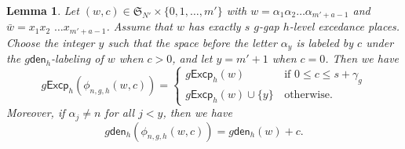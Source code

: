 \documentclass[10pt,a4paper]{amsart}
\newtheorem{lemma}{Lemma}
\def\Excp{\mathsf{Excp}}
\def\den{\mathsf{den}}
\begin{document}
\begin{lemma}\label{lem-phi-den1}
Let $(w, c)\in  \mathfrak{S}_{N'}\times  \{0,1, \ldots, m'\}$ with $w=\alpha_1\alpha_2\ldots \alpha_{m'+a-1}$ and  $\bar{w}=x_1x_2$ $\ldots x_{m'+a-1}$. Assume that $w$ has exactly $s$ $g$-gap $h$-level excedance places.
Choose the integer $y$ such that    the space before  the letter  $\alpha_y$ is labeled by $c$  under the   $g\den_h$-labeling  of $w$ when $c>0$,  and let $y=m'+1$ when $c=0$.   Then we have 
\begin{equation}\label{eq-Excp_r}
	g\Excp_h(\phi_{n,g,h}(w, c))=\left\{ \begin{array}{ll}
		g\Excp_h(w)&\, \mathrm{if}\,\,   0\leq c\leq s+\gamma_g  \\
		g\Excp_h(w)\cup \{y\}&\, \mathrm{otherwise}.
	\end{array}
	\right.
\end{equation}
Moreover, 
	if  $\alpha_j\neq n$ for all $j<y$, then we have 
	\begin{equation}\label{eq-den_r}
g\den_h(\phi_{n,g,h}(w, c))=g\den_h(w)+c.
	\end{equation}
	\end{lemma}
\end{document}
